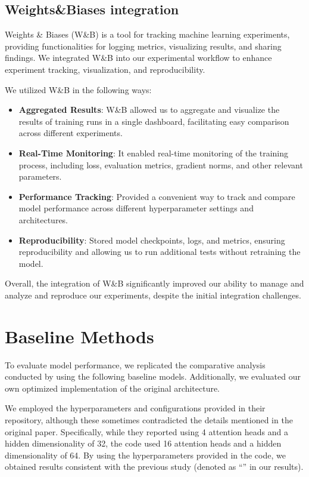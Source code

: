 \subsection{Weights\&Biases integration}

Weights \& Biases (W\&B) \cite{wandb} is a tool for tracking machine learning experiments, providing functionalities for logging metrics, visualizing results, and sharing findings. We integrated W\&B into our experimental workflow to enhance experiment tracking, visualization, and reproducibility.

We utilized W\&B in the following ways:
\begin{itemize}
    \item \textbf{Aggregated Results}: W\&B allowed us to aggregate and visualize the results of training runs in a single dashboard, facilitating easy comparison across different experiments.
    \item \textbf{Real-Time Monitoring}: It enabled real-time monitoring of the training process, including loss, evaluation metrics, gradient norms, and other relevant parameters.
    \item \textbf{Performance Tracking}: Provided a convenient way to track and compare model performance across different hyperparameter settings and architectures.
    \item \textbf{Reproducibility}: Stored model checkpoints, logs, and metrics, ensuring reproducibility and allowing us to run additional tests without retraining the model.
\end{itemize}

Overall, the integration of W\&B significantly improved our ability to manage and analyze and reproduce our experiments, despite the initial integration challenges.

\section{Baseline Methods}
\label{sec:baselines}

To evaluate model performance, we replicated the comparative analysis conducted by \citeauthor{STraTS2022} using the following baseline models.
Additionally, we evaluated our own optimized implementation of the original  architecture.

We employed the hyperparameters and configurations provided in their repository, although these sometimes contradicted the details mentioned in the original paper. Specifically, while they reported using 4 attention heads and a hidden dimensionality of 32, the code used 16 attention heads and a hidden dimensionality of 64. By using the hyperparameters provided in the code, we obtained results consistent with the previous study (denoted as ``'' in our results).

